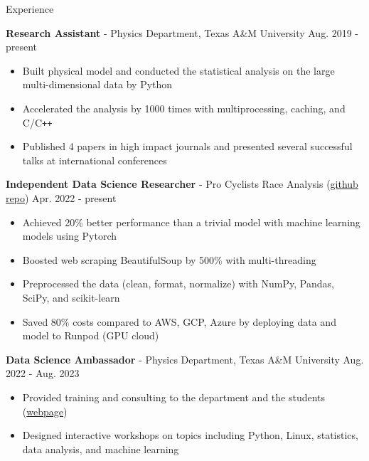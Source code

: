 \documentclass{resume}
\begin{document}
\vspace{-0.5em}
\begin{rSection}{Experience}
    \vspace{-1em}
    \item \textbf{Research Assistant} - Physics Department, Texas A\&M University \hfill Aug. 2019 - present
        \begin{itemize}
        \item Built physical model and conducted the statistical analysis on the large multi-dimensional data by Python
        \item Accelerated the analysis by 1000 times with multiprocessing, caching, and C/C\texttt{++}
        \item Published 4 papers in high impact journals and presented several successful talks at international conferences
        \end{itemize}

    \item \textbf{Independent Data Science Researcher} - {Pro Cyclists Race Analysis} (\href{https://github.com/noctildon/pro_cyclists}{github repo}) \hfill Apr. 2022 - present
        \begin{itemize}
        \item Achieved 20\% better performance than a trivial model with machine learning models using Pytorch
        \item Boosted web scraping BeautifulSoup by 500\% with multi-threading
        \item Preprocessed the data (clean, format, normalize) with NumPy, Pandas, SciPy, and scikit-learn
        \item Saved 80\% costs compared to AWS, GCP, Azure by deploying data and model to Runpod (GPU cloud)
        \end{itemize}

    \item \textbf{Data Science Ambassador} - Physics Department, Texas A\&M University \hfill Aug. 2022 - Aug. 2023
        \begin{itemize}
        \item Provided training and consulting to the department and the students (\href{https://noctildon.github.io/DS_ambassador/index.html}{webpage})
        \item Designed interactive workshops on topics including Python, Linux, statistics, data analysis, and machine learning
        \end{itemize}


\end{rSection}
\end{document}

